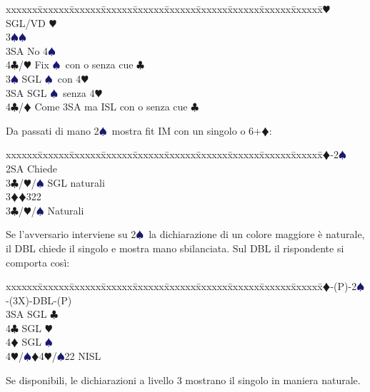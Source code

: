\documentclass[a4paper,italian]{article}
\newcommand{\BC}{\textcolor{OliveGreen}{$\clubsuit$}}
\newcommand{\BD}{\textcolor{RedOrange}{$\vardiamondsuit$}}
\newcommand{\BH}{\textcolor{Red2}{$\varheartsuit${}}}
\newcommand{\BS}{\textcolor{MidnightBlue}{$\spadesuit${}}}
\newenvironment{bidtable}
{\begin{tabbing}

    xxxxxx\=xxxxxx\=xxxxxx\=xxxxxx\=xxxxxx\=xxxxxx\=xxxxxx\=xxxxxx\=xxxxxx\=xxxxxx\=\kill}
{\end{tabbing} }%
\newenvironment{attenzione}[1]
{\begin{tcolorbox}[colframe=red!80!white,title=#1]}
    {
\end{tcolorbox} }%
\begin{document}
\begin{multicols}{2}
\begin{bidtable}
                                            3\BH \> SGL/VD \BH \+\\
                                            3\BS {}\BS \+\\
                                            3SA \> No 4\BS \\
                                            4\BC/\BH \> Fix \BS\ con o senza cue \BC \-\-\\
                                            3\BS \> SGL \BS\ con 4\BH \\
                                            3SA \> SGL \BS\ senza 4\BH \\
                                            4\BC/\BD \> Come 3SA ma ISL con o senza cue \BC \\
                                        \end{bidtable}
                                        Da passati di mano 2\BS\ mostra fit IM con un singolo o 6+\BD:
                                        \begin{bidtable}
                                            1\BD-2\BS\+\\
                                            2SA \> Chiede\+\\
                                            3\BC/\BH/\BS \> SGL naturali\\
                                            3\BD {}\BD322\-\\
                                            3\BC/\BH/\BS \> Naturali\-\\
                                        \end{bidtable}
                                    \end{multicols}

                                    \begin{attenzione}{Interferenze}
                                        Se l'avversario interviene su 2\BS\ la dichiarazione di un colore maggiore è naturale, il DBL chiede il singolo e mostra mano sbilanciata. Sul DBL il rispondente si comporta così:
                                        \bigbreak
                                        \begin{bidtable}
                                            1\BD-(P)-2\BS-(3X)-DBL-(P)\+\\
                                            3SA \> SGL \BC \\
                                            4\BC \> SGL \BH \\
                                            4\BD \> SGL \BS \\
                                            4\BH/\BS {}\BD 4\BH /\BS 22 NISL\-
                                        \end{bidtable}
                                        \bigbreak
                                        Se disponibili, le dichiarazioni a livello 3 mostrano il singolo in maniera naturale.
                                    \end{attenzione}
\end{document}
